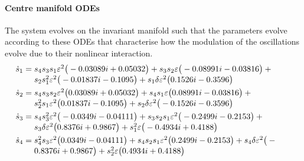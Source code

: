 \paragraph{Centre manifold ODEs} 
The system evolves on the invariant manifold such
that the parameters evolve according to these ODEs that characterise how the modulation of the oscillations evolve due to their nonlinear interaction.
\begin{align*}&
\dot s_{1}=\parbox[t]{0.9\linewidth}{\raggedright\(
s_{4} s_{3} s_{1} \eps^{2} \big(-0.03089 i+0.05032\big)+s
_{3} s_{2} \eps \big(-0.08991 i-0.03816\big)+s_{2} s_{1}^{2} \eps^{2
} \big(-0.01837 i-0.1095\big)+s_{1} \delta  \eps^{2} \big(0.1526 i
-0.3596\big)
\)}
\\&
\dot s_{2}=\parbox[t]{0.9\linewidth}{\raggedright\(
s_{4} s_{3} s_{2} \eps^{2} \big(0.03089 i+0.05032\big)+s_
{4} s_{1} \eps \big(0.08991 i-0.03816\big)+s_{2}^{2} s_{1} \eps^{2} 
\big(0.01837 i-0.1095\big)+s_{2} \delta  \eps^{2} \big(-0.1526 i-
0.3596\big)
\)}
\\&
\dot s_{3}=\parbox[t]{0.9\linewidth}{\raggedright\(
s_{4} s_{3}^{2} \eps^{2} \big(-0.0349 i-0.04111\big)+s_{3
} s_{2} s_{1} \eps^{2} \big(-0.2499 i-0.2153\big)+s_{3} \delta  \eps
^{2} \big(0.8376 i+0.9867\big)+s_{1}^{2} \eps \big(-0.4934 i+
0.4188\big)
\)}
\\&
\dot s_{4}=\parbox[t]{0.9\linewidth}{\raggedright\(
s_{4}^{2} s_{3} \eps^{2} \big(0.0349 i-0.04111\big)+s_{4}
 s_{2} s_{1} \eps^{2} \big(0.2499 i-0.2153\big)+s_{4} \delta  \eps^{
2} \big(-0.8376 i+0.9867\big)+s_{2}^{2} \eps \big(0.4934 i+
0.4188\big)
\)}
\end{align*}


